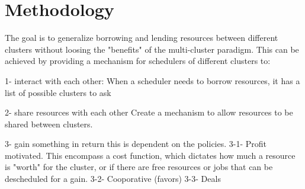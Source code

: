 \section{Methodology}
The goal is to generalize borrowing and lending resources between different clusters 
without loosing the "benefits" of the multi-cluster paradigm. %
This can be achieved by providing a mechanism for schedulers of different clusters to:

1- interact with each other:
When a scheduler needs to borrow resources, it has a list of possible clusters to ask

2- share resources with each other
Create a mechanism to allow resources to be shared between clusters.

3- gain something in return
this is dependent on the policies.
3-1- Profit motivated. This encompass a cost function, which dictates how much a resource is "worth" for
the cluster, or if there are free resources or jobs that can be descheduled for a gain.
3-2- Cooporative (favors)
3-3- Deals